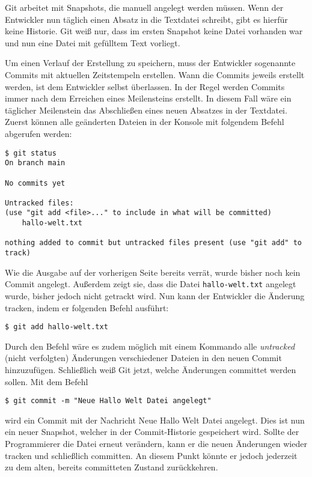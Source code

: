 Git arbeitet mit Snapshots, die manuell angelegt werden müssen. Wenn der
Entwickler nun täglich einen Absatz in die Textdatei schreibt, gibt es hierfür
keine Historie. Git weiß nur, dass im ersten Snapshot keine Datei vorhanden war
und nun eine Datei mit gefülltem Text vorliegt.

Um einen Verlauf der Erstellung zu speichern, muss der Entwickler sogenannte
Commits mit aktuellen Zeitstempeln erstellen. Wann die Commits jeweils erstellt
werden, ist dem Entwickler selbst überlassen. In der Regel werden Commits immer
nach dem Erreichen eines Meilensteins erstellt. In diesem Fall wäre ein
täglicher Meilenstein das Abschließen eines neuen Absatzes in der Textdatei.
Zuerst können alle geänderten Dateien in der Konsole mit folgendem Befehl
abgerufen werden:

\begin{lstlisting}[style=Bash]
$ git status
On branch main

No commits yet

Untracked files:
(use "git add <file>..." to include in what will be committed)
    hallo-welt.txt

nothing added to commit but untracked files present (use "git add" to track)
\end{lstlisting}

\newpage

Wie die Ausgabe auf der vorherigen Seite bereits verrät, wurde bisher noch kein
Commit angelegt. Außerdem zeigt sie, dass die Datei \texttt{hallo-welt.txt}
angelegt wurde, bisher jedoch nicht getrackt wird. Nun kann der Entwickler die
Änderung tracken, indem er folgenden Befehl ausführt:

\begin{lstlisting}[style=Bash]
$ git add hallo-welt.txt
\end{lstlisting}

Durch den Befehl  wäre es zudem möglich mit einem Kommando alle
\emph{untracked} (nicht verfolgten) Änderungen verschiedener Dateien in den
neuen Commit hinzuzufügen. Schließlich weiß Git jetzt, welche Änderungen
committet werden sollen. Mit dem Befehl

\begin{lstlisting}[style=Bash]
$ git commit -m "Neue Hallo Welt Datei angelegt"
\end{lstlisting}

\noindent
wird ein Commit mit der Nachricht \glqq Neue Hallo Welt Datei\grqq{} angelegt.
Dies ist nun ein neuer Snapshot, welcher in der Commit-Historie gespeichert
wird. Sollte der Programmierer die Datei erneut verändern, kann er die neuen
Änderungen wieder tracken und schließlich committen. An diesem Punkt könnte er
jedoch jederzeit zu dem alten, bereits committeten Zustand zurückkehren.

